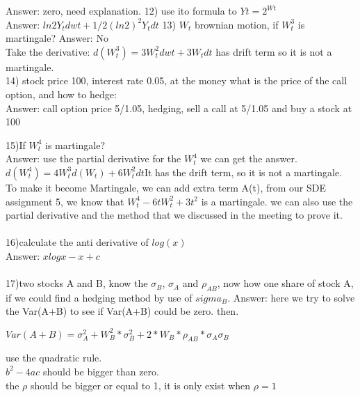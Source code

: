 \documentclass[12pt]{article}
\theoremstyle{plain}
\begin{document}
Answer: zero, need explanation.
\vskip 10pt
12) use ito formula to $Yt=2^{Wt}$\\
Answer: $ln2Y_tdwt+ 1/2 (ln2)^2Y_tdt$
\vskip 10pt
13) $W_t$ brownian motion, if $W_t^3$ is martingale?
Answer: No \\

Take the derivative: $d(W_t^3)=3W_t^2dwt+3W_tdt$ has drift term so it is not a martingale.\\
\vskip 10pt
14) stock price 100, interest rate 0.05, at the money
what is the price of the call option, and how to hedge:\\
Answer: call option price 5/1.05, hedging, sell a call at 5/1.05 and buy a stock at 100

15)If $W_t^4$ is martingale?\\
Answer: use the partial derivative for the $W_t^4$ we can get the answer.
$d(W_t^4)=4W_t^3d(W_t)+6W_t^2dt$It has the drift term, so it is not a martingale.\\
To make it become Martingale, we can add extra term A(t), from our SDE assignment 5, we know that $W_t^4-6tW_t^2+3t^2$ is a martingale. we can also use the partial derivative and the method that we discussed in the meeting to prove it.\\\\

16)calculate the anti derivative of $log(x)$\\
Answer: $xlogx-x+c$\\\\

17)two stocks A and B, know the $\sigma_B$, $\sigma_A$ and $\rho_{AB}$, now how one share of stock A, if we could find a hedging method by use of $sigma_B$.
Answer: here we try to solve the Var(A+B) to see if Var(A+B) could be zero. then.

$Var(A+B)=\sigma_A^2+W_B^2*\sigma_B^2+2*W_B*\rho_{AB}*\sigma_A\sigma_B$

use the quadratic rule. \\

$b^2- 4ac$ should be bigger than zero. \\

the $\rho$ should be bigger or equal to 1, it is only exist when $\rho =1$\\\\
\end{document}
